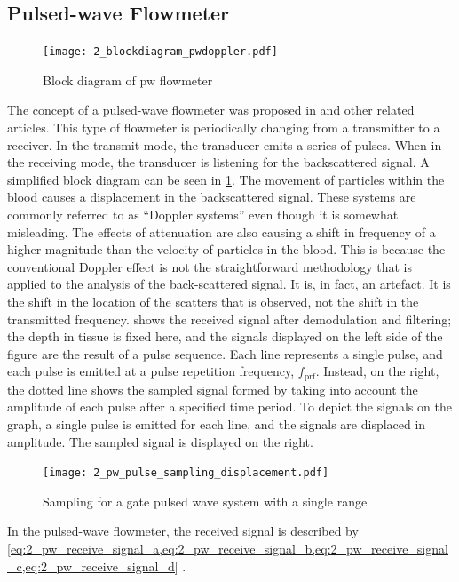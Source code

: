 \subsection{Pulsed-wave Flowmeter}
\begin{figure}[htbp]
	\centering
	\texttt{[image: 2\_blockdiagram\_pwdoppler.pdf]}
	\caption[Block diagram of pulsed-wave flowmeter]{Block diagram of \gls{pw} flowmeter \cite{JensenUltrasoundBook}}
	\label{fig:2_devices_pw}
\end{figure}
The concept of a pulsed-wave flowmeter was proposed in \cite{Baker1970} and other related articles. This type of flowmeter is periodically changing from a transmitter to a receiver. In the transmit mode, the transducer emits a series of pulses. When in the receiving mode, the transducer is listening for the backscattered signal. A simplified block diagram can be seen in \cref{fig:2_devices_pw}. The movement of particles within the blood causes a displacement in the backscattered signal. These systems are commonly referred to as \enquote{Doppler systems} even though it is somewhat misleading. The effects of attenuation are also causing a shift in frequency of a higher magnitude than the velocity of particles in the blood. This is because the conventional Doppler effect is not the straightforward methodology that is applied to the analysis of the back-scattered signal. It is, in fact, an artefact. It is the shift in the location of the scatters that is observed, not the shift in the transmitted frequency.  shows the received signal after demodulation and filtering; the depth in tissue is fixed here, and the signals displayed on the left side of the figure are the result of a pulse sequence. Each line represents a single pulse, and each pulse is emitted at a pulse repetition frequency, $f_{\mathrm{prf}}$. Instead, on the right, the dotted line shows the sampled signal formed by taking into account the amplitude of each pulse after a specified time period. To depict the signals on the graph, a single pulse is emitted for each line, and the signals are displaced in amplitude. The sampled signal is displayed on the right.
\begin{figure}[ht]
	\centering
	\texttt{[image: 2\_pw\_pulse\_sampling\_displacement.pdf]}
	\caption[Sampling for a gate pulsed wave system with a single range]{Sampling for a gate pulsed wave system with a single range \cite{JensenUltrasoundBook}}
	\label{fig:2_pw_sampling_displacement}
\end{figure}
In the pulsed-wave flowmeter, the received signal is described by \cref{eq:2_pw_receive_signal_a,eq:2_pw_receive_signal_b,eq:2_pw_receive_signal_c,eq:2_pw_receive_signal_d} \cite{JensenUltrasoundBook}.
